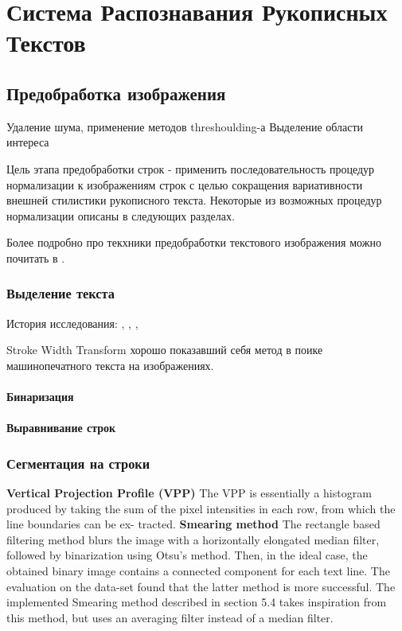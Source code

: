 \chapter{Система Распознавания Рукописных Текстов}

\section{Предобработка изображения}

Удаление шума, применение методов threshoulding-а
Выделение области интереса

Цель этапа предобработки строк - применить последовательность процедур нормализации к изображениям строк с целью сокращения вариативности внешней стилистики рукописного текста. Некоторые из возможных процедур нормализации описаны в следующих разделах.

Более подробно про текхники предобработки текстового изображения можно почитать в \cite{fujisawa2007robustness, durebrandt2015segmentation}.

\subsection{Выделение текста}
\cite{Louloudis2008, Liwicki2007}

История исследования: \cite{durebrandt2015segmentation}, \cite{fischer2012handwriting}, \cite{Louloudis2008}, \cite{Gatos2006}

Stroke Width Transform \cite{Epshtein2010} хорошо показавший себя метод в поике машинопечатного текста на изображениях.

\subsubsection{Бинаризация}

\cite{Gatos2006}

\subsubsection{Выравнивание строк}
\subsection{Сегментация на строки}

\textbf{Vertical Projection Profile (VPP)}
The VPP is essentially a histogram produced by taking the sum of the pixel intensities in each row, from which the line boundaries can be ex- tracted. \cite{durebrandt2015segmentation}
\textbf{Smearing method}
The rectangle based filtering method blurs the image with a horizontally elongated median filter, followed by binarization using Otsu’s method. Then, in the ideal case, the obtained binary image contains a connected component for each text line. The evaluation on the data-set found that the latter method is more successful. The implemented Smearing method described in section 5.4 takes inspiration from this method, but uses an averaging filter instead of a median filter. \cite{durebrandt2015segmentation}

